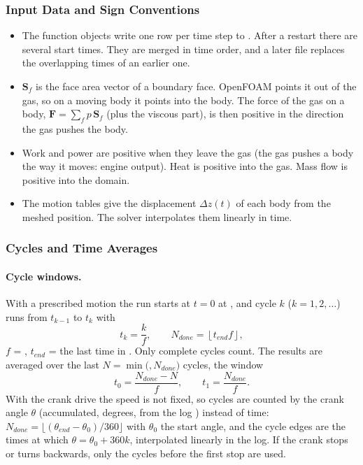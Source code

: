\subsubsection{Input Data and Sign Conventions}
\begin{itemize}
    \item The function objects write one row per time step to . After a restart there are several start times. They are merged in time order, and a later file replaces the overlapping times of an earlier one.
    \item $\mathbf{S}_f$ is the face area vector of a boundary face. OpenFOAM points it out of the gas, so on a moving body it points into the body. The force of the gas on a body, $\mathbf{F} = \sum_f p\,\mathbf{S}_f$ (plus the viscous part), is then positive in the direction the gas pushes the body.
    \item Work and power are positive when they leave the gas (the gas pushes a body the way it moves: engine output). Heat is positive into the gas. Mass flow is positive into the domain.
    \item The motion tables give the displacement $\Delta z(t)$ of each body from the meshed position. The solver interpolates them linearly in time.
\end{itemize}

\subsubsection{Cycles and Time Averages}
\paragraph{Cycle windows.}
With a prescribed motion the run starts at $t = 0$ at , and cycle $k$ ($k = 1, 2, \ldots$) runs from $t_{k-1}$ to $t_k$ with
\begin{equation}
t_k = \frac{k}{f}, \qquad N_{done} = \left\lfloor t_{end} f \right\rfloor ,
\end{equation}
$f$ = , $t_{end}$ = the last time in . Only complete cycles count. The results are averaged over the last $N = \min($$, N_{done})$ cycles, the window
\begin{equation}
t_0 = \frac{N_{done} - N}{f}, \qquad t_1 = \frac{N_{done}}{f} .
\end{equation}
With the crank drive the speed is not fixed, so cycles are counted by the crank angle $\theta$ (accumulated, degrees, from the log ) instead of time: $N_{done} = \lfloor(\theta_{end} - \theta_0)/360\rfloor$ with $\theta_0$ the start angle, and the cycle edges are the times at which $\theta = \theta_0 + 360k$, interpolated linearly in the log. If the crank stops or turns backwards, only the cycles before the first stop are used.

